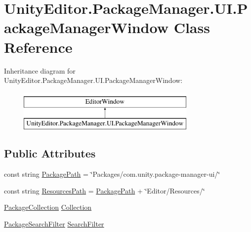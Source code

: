 \hypertarget{class_unity_editor_1_1_package_manager_1_1_u_i_1_1_package_manager_window}{}\section{Unity\+Editor.\+Package\+Manager.\+U\+I.\+Package\+Manager\+Window Class Reference}
\label{class_unity_editor_1_1_package_manager_1_1_u_i_1_1_package_manager_window}
Inheritance diagram for Unity\+Editor.\+Package\+Manager.\+U\+I.\+Package\+Manager\+Window\+:\begin{figure}[H]
\begin{center}
\leavevmode
\includegraphics[height=2.000000cm]{class_unity_editor_1_1_package_manager_1_1_u_i_1_1_package_manager_window}
\end{center}
\end{figure}
\subsection*{Public Attributes}
\begin{DoxyCompactItemize}
\item 
const string \mbox{\hyperlink{class_unity_editor_1_1_package_manager_1_1_u_i_1_1_package_manager_window_a573491faa7f680cb7df43324558673b1}{Package\+Path}} = \char`\"{}Packages/com.\+unity.\+package-\/manager-\/ui/\char`\"{}
\item 
const string \mbox{\hyperlink{class_unity_editor_1_1_package_manager_1_1_u_i_1_1_package_manager_window_ac6bc78a741c9ab19ceeb2fa9a51cf645}{Resources\+Path}} = \mbox{\hyperlink{class_unity_editor_1_1_package_manager_1_1_u_i_1_1_package_manager_window_a573491faa7f680cb7df43324558673b1}{Package\+Path}} + \char`\"{}Editor/Resources/\char`\"{}
\item 
\mbox{\hyperlink{class_unity_editor_1_1_package_manager_1_1_u_i_1_1_package_collection}{Package\+Collection}} \mbox{\hyperlink{class_unity_editor_1_1_package_manager_1_1_u_i_1_1_package_manager_window_a72c0da59b70726fc60b6f7e3f03b6901}{Collection}}
\item 
\mbox{\hyperlink{class_unity_editor_1_1_package_manager_1_1_u_i_1_1_package_search_filter}{Package\+Search\+Filter}} \mbox{\hyperlink{class_unity_editor_1_1_package_manager_1_1_u_i_1_1_package_manager_window_a932456f8d3483ff455636f21e2fc82d7}{Search\+Filter}}
\end{DoxyCompactItemize}


